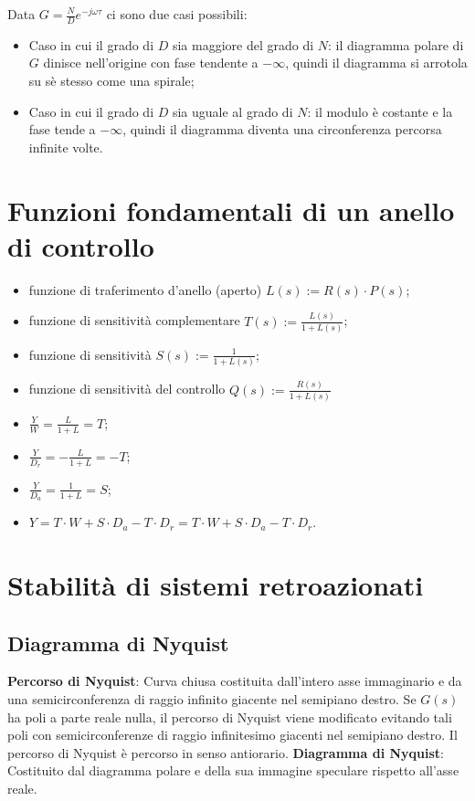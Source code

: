 \begin{landscape}
\begin{multicols*}{3}
\begin{center}
        \end{center}
        Data $G = \frac{N}{D} e^{- j \omega \tau}$ ci sono due casi possibili:
        \begin{itemize}
            \item Caso in cui il grado di $D$ sia maggiore del grado di $N$: il diagramma polare di $G$ dinisce nell'origine con fase tendente a $- \infty$, quindi il diagramma si arrotola su sè stesso come una spirale;
            \item Caso in cui il grado di $D$ sia uguale al grado di $N$: il modulo è costante e la fase tende a $- \infty$, quindi il diagramma diventa una circonferenza percorsa infinite volte.
        \end{itemize}
\end{multicols*}
\begin{multicols*}{2}
    \newpage\section{Funzioni fondamentali di un anello di controllo}
    \begin{itemize}
        \item funzione di traferimento d'anello (aperto) $L(s) := R(s) \cdot P(s)$;
        \item funzione di sensitività complementare $T(s) := \frac{L(s)}{1+ L(s)}$;
        \item funzione di sensitività $S(s) := \frac{1}{1+ L(s)}$;
        \item funzione di sensitività del controllo $Q(s) := \frac{R(s)}{1+L(s)}$
        \item $\frac{Y}{W} = \frac{L}{1+L} = T$;
        \item $\frac{Y}{D_r} = - \frac{L}{1+L} = -T$;
        \item $\frac{Y}{D_a} = \frac{1}{1+L} = S$;
        \item $Y = T \cdot W + S \cdot  D_a -T \cdot D_r = T \cdot W + S \cdot D_a - T \cdot D_r$.
    \end{itemize}
    \section{Stabilità di sistemi retroazionati}
    \subsection{Diagramma di Nyquist}
    \textbf{Percorso di Nyquist}: Curva chiusa costituita dall'intero asse immaginario e da una semicirconferenza di raggio infinito giacente nel semipiano destro. Se $G(s)$ ha poli a parte reale nulla, il percorso di Nyquist viene modificato evitando tali poli con semicirconferenze di raggio infinitesimo giacenti nel semipiano destro. Il percorso di Nyquist è percorso in senso antiorario.\newline
    \newline
    \textbf{Diagramma di Nyquist}: Costituito dal diagramma polare e della sua immagine speculare rispetto all'asse reale.

\end{multicols*}
\end{landscape}

